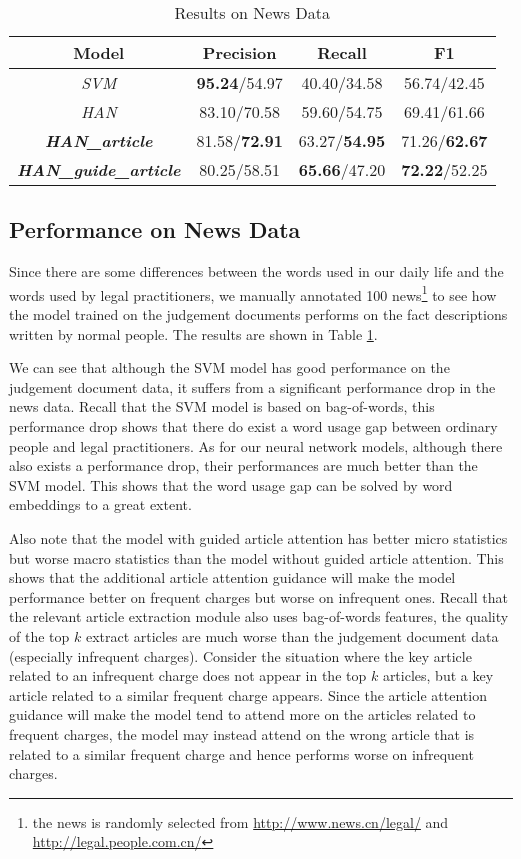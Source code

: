 \begin{table}
\centering
\small{
\begin{tabular}{|c|c|c|c|}
\hline
\textbf{Model}				& \textbf{Precision} 				& \textbf{Recall} 				& \textbf{F1} 	\\
\hline
\textit{SVM} 				& \textbf{95.24}/54.97			& 40.40/34.58  					& 56.74/42.45 				 	\\
\hline
\textit{HAN}				& 83.10/70.58					& 59.60/54.75  					& 69.41/61.66					\\
\hline
\textbf{\textit{HAN\_article}}			& 81.58/\textbf{72.91}			& 63.27/\textbf{54.95} 			& 71.26/\textbf{62.67}					\\
\hline
\textbf{\textit{HAN\_guide\_article}} 	& 80.25/58.51 					& \textbf{65.66}/47.20 			& \textbf{72.22}/52.25 		 	\\
\hline
\end{tabular}
}
\caption{Results on News Data}
\label{tabble_news_results}
\end{table}

\subsection{Performance on News Data}
Since there are some differences between the words used in our daily life and the words used by legal practitioners, we manually annotated 100 news\footnote{the news is randomly selected from \url{http://www.news.cn/legal/} and \url{http://legal.people.com.cn/}} to see how the model trained on the judgement documents performs on the fact descriptions written by normal people. The results are shown in Table \ref{tabble_news_results}.

We can see that although the SVM model has good performance on the judgement document data, it suffers from a significant performance drop in the news data. Recall that the SVM model is based on bag-of-words, this performance drop shows that there do exist a word usage gap between ordinary people and legal practitioners. As for our neural network models, although there also exists a performance drop, their performances are much better than the SVM model. This shows that the word usage gap can be solved by word embeddings to a great extent. 

Also note that the model with guided article attention has better micro statistics but worse macro statistics than the model without guided article attention. This shows that the additional article attention guidance will make the model performance better on frequent charges but worse on infrequent ones. Recall that the relevant article extraction module also uses bag-of-words features, the quality of the top $k$ extract articles are much worse than the judgement document data (especially infrequent charges). Consider the situation where the key article related to an infrequent charge does not appear in the top $k$ articles, but a key article related to a similar frequent charge appears. Since the article attention guidance will make the model tend to attend more on the articles related to frequent charges, the model may instead attend on the wrong article that is related to a similar frequent charge and hence performs worse on infrequent charges.